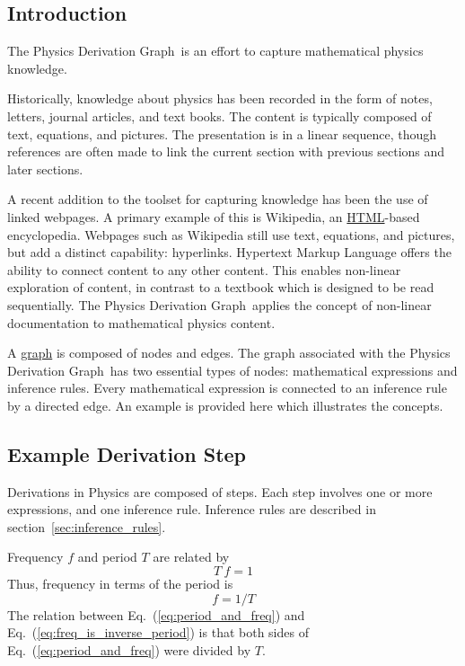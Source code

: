 \documentclass{article}
\newcommand{\eqn}[1]{Eq.\ (\ref{#1})}
\newcommand{\pdg}{Physics Derivation Graph}
\begin{document}
\begin{multicols}{2}

\tableofcontents



\section{Introduction\label{sec:intro}}

The \pdg\ is an effort to capture mathematical physics knowledge. 

Historically, knowledge about physics has been recorded in the form of notes, letters, journal articles, and text books. The content is typically composed of text, equations, and pictures. The presentation is in a linear sequence, though references are often made to link the current section with previous sections and later sections. 

A recent addition to the toolset for capturing knowledge has been the use of linked webpages. A primary example of this is Wikipedia, an \href{https://en.wikipedia.org/wiki/HTML}{HTML}-based encyclopedia. Webpages such as Wikipedia still use text, equations, and pictures, but add a distinct capability: hyperlinks. Hypertext Markup Language offers the ability to connect content to any other content. This enables non-linear exploration of content, in contrast to a textbook which is designed to be read sequentially. The \pdg\ applies the concept of non-linear documentation to mathematical physics content. 

A \href{https://en.wikipedia.org/wiki/Graph_(mathematics)}{graph} is composed of nodes and edges. The graph associated with the \pdg\ has two essential types of nodes: mathematical expressions and inference rules. Every mathematical expression is connected to an inference rule by a directed edge. An example is provided here which illustrates the concepts.

\subsection{Example Derivation Step\label{sec:example}}
Derivations in Physics are composed of steps. Each step involves one or more expressions, and one inference rule. Inference rules are described in section~\ref{sec:inference_rules}. 

Frequency $f$ and period $T$ are related by
\begin{equation}
T\ f = 1
\label{eq:period_and_freq}
\end{equation}
Thus, frequency in terms of the period is
\begin{equation}
f = 1/T
\label{eq:freq_is_inverse_period}
\end{equation}
The relation between \eqn{eq:period_and_freq} and \eqn{eq:freq_is_inverse_period} is that both sides of \eqn{eq:period_and_freq} were divided by $T$. 


\end{multicols}
\end{document}
